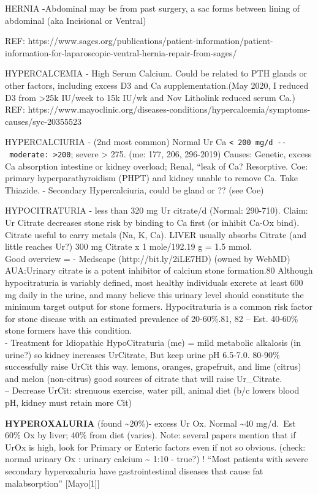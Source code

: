 HERNIA -Abdominal may be from past surgery, a sac forms between lining
of abdominal (aka Incisional or Ventral)

REF:
https://www.sages.org/publications/patient-information/patient-information-for-laparoscopic-ventral-hernia-repair-from-sages/

HYPERCALCEMIA - High Serum Calcium. Could be related to PTH glands or
other factors, including excess D3 and Ca supplementation.(May 2020, I
reduced D3 from \textgreater25k IU/week to 15k IU/wk and Nov Litholink
reduced serum Ca.) REF:
https://www.mayoclinic.org/diseases-conditions/hypercalcemia/symptoms-causes/syc-20355523

HYPERCALCIURIA - (2nd most common) Normal Ur Ca
\texttt{\textless{}\ 200\ mg/d\ -\/-\ moderate:\ \textgreater{}200};
severe \textgreater{} 275. (me: 177, 206, 296-2019) Causes: Genetic,
excess Ca absorption intestine or kidney overload; Renal, ``leak of Ca?
Resorptive. Coe: primary hyperparathyroidism (PHPT) and kidney unable to
remove Ca. Take Thiazide. - Secondary Hypercalciuria, could be gland or
?? (see Coe)

HYPOCITRATURIA - less than 320 mg Ur citrate/d (Normal: 290-710). Claim:
Ur Citrate decreases stone risk by binding to Ca first (or inhibit Ca-Ox
bind). Citrate useful to carry metals (Na, K, Ca). LIVER usually absorbs
Citrate (and little reaches Ur?) 300 mg Citrate x 1 mole/192.19 g = 1.5
mmol.\\
Good overview = - Medscape (http://bit.ly/2iLE7HD) (owned by WebMD)
AUA:Urinary citrate is a potent inhibitor of calcium stone formation.80
Although hypocitraturia is variably defined, most healthy individuals
excrete at least 600 mg daily in the urine, and many believe this
urinary level should constitute the minimum target output for stone
formers. Hypocitraturia is a common risk factor for stone disease with
an estimated prevalence of 20-60\%.81, 82 -- Est. 40-60\% stone formers
have this condition.\\
- Treatment for Idiopathic HypoCitraturia (me) = mild metabolic
alkalosis (in urine?) so kidney increases UrCitrate, But keep urine pH
6.5-7.0. 80-90\% successfully raise UrCit this way. lemons, oranges,
grapefruit, and lime (citrus) and melon (non-citrus) good sources of
citrate that will raise Ur\_Citrate.\\
-- Decrease UrCit: strenuous exercise, water pill, animal diet (b/c
lowers blood pH, kidney must retain more Cit)

\textbf{HYPEROXALURIA} (found \textasciitilde20\%)- excess Ur Ox. Normal
\textasciitilde40 mg/d.~Est 60\% Ox by liver; 40\% from diet (varies).
Note: several papers mention that if UrOx is high, look for Primary or
Enteric factors even if not so obvious. (check: normal urinary Ox :
urinary calcium \textasciitilde{} 1:10 - true?) ! ``Most patients with
severe secondary hyperoxaluria have gastrointestinal diseases that cause
fat malabsorption'' {[}Mayo{[}1{]}{]}

